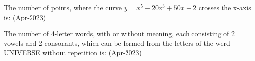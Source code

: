 \item The number of points, where the curve $y=x^{5}-20x^{3}+50x+2$ crosses the x-axis is: \hfill(Apr-2023)

\item The number of 4-letter words, with or without meaning, each consisting of 2 vowels and 2 consonants, which can be formed from the letters of the word UNIVERSE without repetition is: \hfill(Apr-2023)

